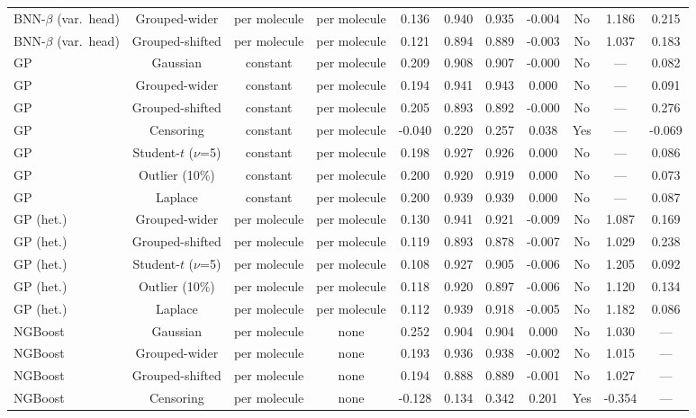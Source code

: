 \begin{table}[!htbp]
\begin{adjustbox}{max width=\textwidth,max totalheight=0.78\textheight}
\begin{tabular}{lcccccccccc}
BNN-$\beta$ (var.\ head) & Grouped-wider & per molecule & per molecule & 0.136 & 0.940 & 0.935 & -0.004 & No & 1.186 & 0.215 \\
BNN-$\beta$ (var.\ head) & Grouped-shifted & per molecule & per molecule & 0.121 & 0.894 & 0.889 & -0.003 & No & 1.037 & 0.183 \\
GP & Gaussian & constant & per molecule & 0.209 & 0.908 & 0.907 & -0.000 & No & --- & 0.082 \\
GP & Grouped-wider & constant & per molecule & 0.194 & 0.941 & 0.943 & 0.000 & No & --- & 0.091 \\
GP & Grouped-shifted & constant & per molecule & 0.205 & 0.893 & 0.892 & -0.000 & No & --- & 0.276 \\
GP & Censoring & constant & per molecule & -0.040 & 0.220 & 0.257 & 0.038 & Yes & --- & -0.069 \\
GP & Student-$t$ ($\nu$=5) & constant & per molecule & 0.198 & 0.927 & 0.926 & 0.000 & No & --- & 0.086 \\
GP & Outlier (10\%) & constant & per molecule & 0.200 & 0.920 & 0.919 & 0.000 & No & --- & 0.073 \\
GP & Laplace & constant & per molecule & 0.200 & 0.939 & 0.939 & 0.000 & No & --- & 0.087 \\
GP (het.) & Grouped-wider & per molecule & per molecule & 0.130 & 0.941 & 0.921 & -0.009 & No & 1.087 & 0.169 \\
GP (het.) & Grouped-shifted & per molecule & per molecule & 0.119 & 0.893 & 0.878 & -0.007 & No & 1.029 & 0.238 \\
GP (het.) & Student-$t$ ($\nu$=5) & per molecule & per molecule & 0.108 & 0.927 & 0.905 & -0.006 & No & 1.205 & 0.092 \\
GP (het.) & Outlier (10\%) & per molecule & per molecule & 0.118 & 0.920 & 0.897 & -0.006 & No & 1.120 & 0.134 \\
GP (het.) & Laplace & per molecule & per molecule & 0.112 & 0.939 & 0.918 & -0.005 & No & 1.182 & 0.086 \\
NGBoost & Gaussian & per molecule & none & 0.252 & 0.904 & 0.904 & 0.000 & No & 1.030 & --- \\
NGBoost & Grouped-wider & per molecule & none & 0.193 & 0.936 & 0.938 & -0.002 & No & 1.015 & --- \\
NGBoost & Grouped-shifted & per molecule & none & 0.194 & 0.888 & 0.889 & -0.001 & No & 1.027 & --- \\
NGBoost & Censoring & per molecule & none & -0.128 & 0.134 & 0.342 & 0.201 & Yes & -0.354 & --- \\

\end{tabular}
\end{adjustbox}
\end{table}
